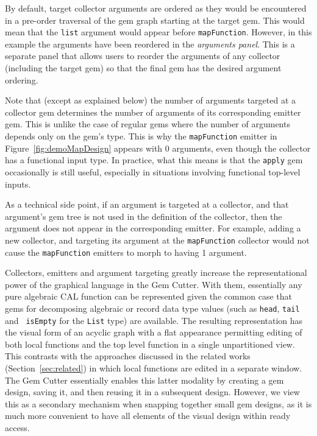 \documentclass[preprint]{sigplanconf}
\begin{document}
By default, target collector arguments are ordered as they would be encountered 
in a pre-order traversal of the gem graph starting at the target gem.
This would mean that the {\tt list} argument would appear before {\tt mapFunction}.
However, in this example the arguments have been reordered in the {\it arguments panel}. 
This is a separate panel that allows users to reorder the arguments of any
collector (including the target gem) so that the final gem has the
desired argument ordering.

Note that (except as explained below) the number of arguments targeted at a collector gem determines
the number of arguments of its corresponding emitter gem. This is unlike the
case of regular gems where the number of arguments depends only on the gem's type.
This is why the {\tt mapFunction} emitter in Figure~\ref{fig:demoMapDesign} appears 
with 0 arguments, even though the collector has a functional input type.
In practice, what this means is that the {\tt apply} gem occasionally is still
useful, especially in situations involving functional top-level inputs. 

As a technical side point, if an argument is targeted at a collector, and that argument's
gem tree is not used in the definition of the collector, then the argument does
not appear in the corresponding emitter. For example, adding a new collector, and
targeting its argument at the {\tt mapFunction} collector would not cause the
{\tt mapFunction} emitters to morph to having 1 argument. 

Collectors, emitters and argument targeting greatly increase the
representational power of the graphical language in the Gem
Cutter. With them, essentially any pure algebraic CAL function can be
represented given the common case that gems for decomposing algebraic
or record data type values (such as {\tt head}, {\tt tail} and {\tt
isEmpty} for the {\tt List} type) are available. The resulting
representation has the visual form of an acyclic graph with a flat
appearance permitting editing of both local functions and the top
level function in a single unpartitioned view. This contrasts with the approaches
discussed in the related works (Section~\ref{sec:related}) in which local functions
are edited in a separate window. The Gem Cutter essentially enables
this latter modality by creating a gem design, saving it, and then
reusing it in a subsequent design. However, we view this as a
secondary mechanism when snapping together small gem designs, as it is
much more convenient to have all elements of the visual design within
ready access.
\end{document}
